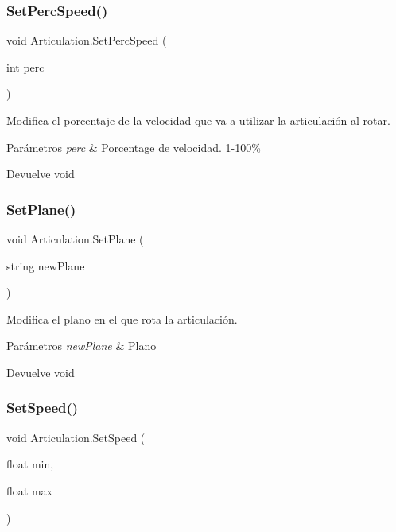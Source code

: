 \subsubsection{\texorpdfstring{SetPercSpeed()}{SetPercSpeed()}}
{\footnotesize\ttfamily void Articulation.\+Set\+Perc\+Speed (\begin{DoxyParamCaption}\item[{int}]{perc }\end{DoxyParamCaption})\hspace{0.3cm}{\ttfamily [inline]}}

Modifica el porcentaje de la velocidad que va a utilizar la articulación al rotar. 
\begin{DoxyParams}{Parámetros}
{\em perc} & Porcentage de velocidad. 1-\/100\% \\
\hline
\end{DoxyParams}
\begin{DoxyReturn}{Devuelve}
void 
\end{DoxyReturn}
\mbox{\label{class_articulation_abc1e52ec4c3370c2b8dd20b257c437ac}} 
\subsubsection{\texorpdfstring{SetPlane()}{SetPlane()}}
{\footnotesize\ttfamily void Articulation.\+Set\+Plane (\begin{DoxyParamCaption}\item[{string}]{new\+Plane }\end{DoxyParamCaption})\hspace{0.3cm}{\ttfamily [inline]}}

Modifica el plano en el que rota la articulación. 
\begin{DoxyParams}{Parámetros}
{\em new\+Plane} & Plano \\
\hline
\end{DoxyParams}
\begin{DoxyReturn}{Devuelve}
void 
\end{DoxyReturn}
\mbox{\label{class_articulation_a6522fc73e75eb5953305d51fcae10466}} 
\subsubsection{\texorpdfstring{SetSpeed()}{SetSpeed()}}
{\footnotesize\ttfamily void Articulation.\+Set\+Speed (\begin{DoxyParamCaption}\item[{float}]{min,  }\item[{float}]{max }\end{DoxyParamCaption})\hspace{0.3cm}{\ttfamily [inline]}}


